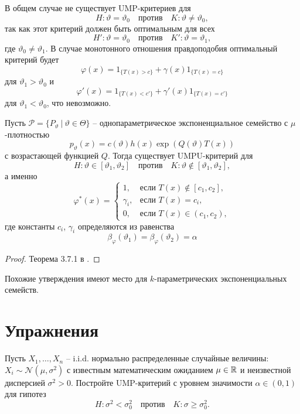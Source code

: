 \begin{rmrk}
	В общем случае не существует UMP-критериев для
	\[ H:\vartheta = \vartheta_0 \quad \text{против} \quad K:\vartheta \neq \vartheta_0, \]
	так как этот критерий должен быть оптимальным для всех
	\[ H':\vartheta = \vartheta_0 \quad \text{против} \quad K':\vartheta = \vartheta_1, \]
	где $\vartheta_0 \neq \vartheta_1$.
	В случае монотонного отношения правдоподобия оптимальный критерий будет
	\[ \varphi(x) = 1_{\{ T(x) > c \}} + \gamma(x) 1_{\{T(x) = c\}} \]
	для $\vartheta_1 > \vartheta_0$ и
	\[ \varphi'(x) = 1_{\{ T(x) < c'\}} + \gamma'(x) 1_{\{T(x) = c'\}} \]
	для $\vartheta_1 < \vartheta_0$, что невозможно.
\end{rmrk}

\begin{thm} \label{thm6.26}
	Пусть $\mathcal{P} = \{ P_\vartheta\ |\ \vartheta \in \Theta \}$ -- однопараметрическое экспоненциальное семейство с $\mu$-плотностью
	\[p_\vartheta(x) = c(\vartheta)h(x)\exp(Q(\vartheta) T(x)) \]
	с возрастающей функцией $Q$. Тогда существует UMPU-критерий для
	\[ H:\vartheta \in [\vartheta_1, \vartheta_2] \quad \text{против} \quad K:\vartheta \notin [\vartheta_1, \vartheta_2], \]
	а именно
	\[ \varphi^*(x) = 
	\left \{
	\begin{array}{cl}
	1, & \text{если } T(x) \notin [c_1, c_2], \\
	\gamma_i, & \text{если } T(x) = c_i, \\
	0, & \text{если } T(x) \in (c_1, c_2),
	\end{array}
	\right.
	\]
	где константы $c_i$, $\gamma_i$ определяются из равенства
	\[ \beta_\varphi(\vartheta_1) = \beta_\varphi(\vartheta_2) = \alpha \]
\end{thm}
\begin{proof}
	Теорема 3.7.1 в \cite{LehmannRomano}.
\end{proof}

\begin{rmrk}
	Похожие утверждения имеют место для $k$-параметрических экспоненциальных семейств.
\end{rmrk}

\raggedbottom
\pagebreak

\section*{Упражнения}
\begin{exc}
	Пусть $X_1, \dots, X_n$ -- i.i.d. нормально распределенные случайные величины: $X_i \sim \mathcal{N}(\mu, \sigma^2)$ с известным математическим ожиданием $\mu \in \mathbb{R}$ и неизвестной дисперсией $\sigma^2 > 0$. Постройте UMP-критерий с уровнем значимости $\alpha \in (0, 1)$ для гипотез
	\[H: \sigma^2 < \sigma_0^2 \quad \text{против} \quad K:\sigma \geq \sigma_0^2.  \]
\end{exc}


